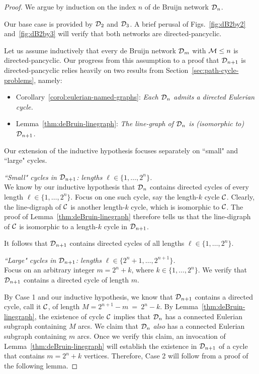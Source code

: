 \begin{proof}
We argue by induction on the index $n$ of de Bruijn network $\mbox{$\cal D$}_n$.

Our base case is provided by $\mbox{$\cal D$}_2$ and $\mbox{$\cal D$}_3$.  A brief perusal of Figs.~\ref{fig:dB2by2} 
and~\ref{fig:dB2by3} will verify that both networks are directed-pancyclic.

Let us assume inductively that every de Bruijn network $\mbox{$\cal D$}_m$ with $\mbox{$\cal M$} \leq n$ is 
directed-pancyclic.  Our progress from this assumption to a proof that $\mbox{$\cal D$}_{n+1}$ is 
directed-pancyclic relies heavily on two results from Section~\ref{sec:path-cycle-problems}, 
namely:
\begin{itemize}
\item
Corollary~\ref{corol:eulerian-named-graphs}: {\em Each $\mbox{$\cal D$}_n$ admits a directed Eulerian cycle.}
\item
Lemma~\ref{thm:deBruin-linegraph}: {\em The line-graph of $\mbox{$\cal D$}_n$ is (isomorphic to) $\mbox{$\cal D$}_{n+1}$.}
\end{itemize}
Our extension of the inductive hypothesis focuses separately on ``small"  and ``large" cycles.

\medskip

  {\em ``Small" cycles in $\mbox{$\cal D$}_{n+1}$: lengths $\ell \in \{1, \ldots, 2^n\}$.} \\
We know by our inductive hypothesis that $\mbox{$\cal D$}_n$ contains directed cycles of every length
$\ell \in \{1, \ldots, 2^n\}$.  Focus on one such cycle, say the length-$k$ cycle $\mbox{$\cal C$}$.  Clearly,
the line-digraph of $\mbox{$\cal C$}$ is another length-$k$ cycle, which is isomorphic to $\mbox{$\cal C$}$.  The proof of
Lemma~\ref{thm:deBruin-linegraph} therefore tells us that the line-digraph of $\mbox{$\cal C$}$ is
isomorphic to a length-$k$ cycle in $\mbox{$\cal D$}_{n+1}$.

It follows that $\mbox{$\cal D$}_{n+1}$ contains directed cycles of all lengths $\ell \in \{1, \ldots, 2^n\}$.

\medskip

 {\em ``Large" cycles in $\mbox{$\cal D$}_{n+1}$: lengths $\ell \in \{2^n+ 1, \ldots, 2^{n+1}\}$.} \\
Focus on an arbitrary integer $m = 2^n +k$, where $k \in \{1, \ldots, 2^n\}$.  We verify that $\mbox{$\cal D$}_{n+1}$
contains a directed cycle of length $m$.

By Case 1 and our inductive hypothesis, we know that $\mbox{$\cal D$}_{n+1}$ contains a directed cycle, call
it $\mbox{$\cal C$}$, of length $M = 2^{n+1} - m \ = \ 2^n -k$.  By Lemma~\ref{thm:deBruin-linegraph}, the
existence  of cycle $\mbox{$\cal C$}$ implies that $\mbox{$\cal D$}_n$ has a connected Eulerian subgraph
containing $M$ arcs.  We claim that $\mbox{$\cal D$}_n$ {\em also} has a connected Eulerian subgraph
containing $m$ arcs.  Once we verify this claim, an invocation of
Lemma~\ref{thm:deBruin-linegraph} will establish the existence in $\mbox{$\cal D$}_{n+1}$ of a cycle that
contains $m = 2^n +k$ vertices.  Therefore, Case 2 will follow from a proof of the following lemma.


\end{proof}
